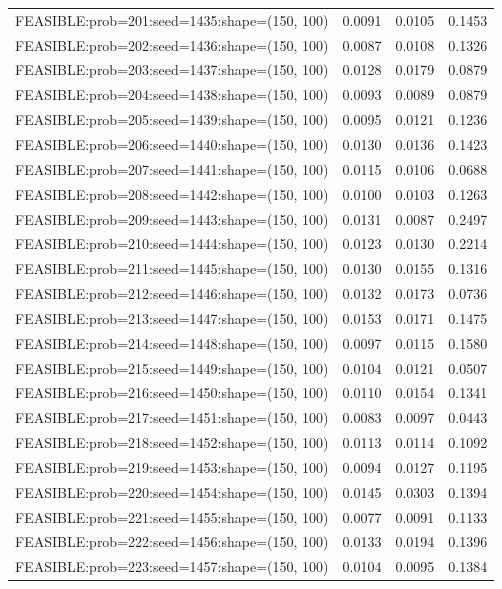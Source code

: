 \begin{longtable}{lccc}
FEASIBLE:prob=201:seed=1435:shape=(150, 100) & 0.0091 & 0.0105 & 0.1453 \\
FEASIBLE:prob=202:seed=1436:shape=(150, 100) & 0.0087 & 0.0108 & 0.1326 \\
FEASIBLE:prob=203:seed=1437:shape=(150, 100) & 0.0128 & 0.0179 & 0.0879 \\
FEASIBLE:prob=204:seed=1438:shape=(150, 100) & 0.0093 & 0.0089 & 0.0879 \\
FEASIBLE:prob=205:seed=1439:shape=(150, 100) & 0.0095 & 0.0121 & 0.1236 \\
FEASIBLE:prob=206:seed=1440:shape=(150, 100) & 0.0130 & 0.0136 & 0.1423 \\
FEASIBLE:prob=207:seed=1441:shape=(150, 100) & 0.0115 & 0.0106 & 0.0688 \\
FEASIBLE:prob=208:seed=1442:shape=(150, 100) & 0.0100 & 0.0103 & 0.1263 \\
FEASIBLE:prob=209:seed=1443:shape=(150, 100) & 0.0131 & 0.0087 & 0.2497 \\
FEASIBLE:prob=210:seed=1444:shape=(150, 100) & 0.0123 & 0.0130 & 0.2214 \\
FEASIBLE:prob=211:seed=1445:shape=(150, 100) & 0.0130 & 0.0155 & 0.1316 \\
FEASIBLE:prob=212:seed=1446:shape=(150, 100) & 0.0132 & 0.0173 & 0.0736 \\
FEASIBLE:prob=213:seed=1447:shape=(150, 100) & 0.0153 & 0.0171 & 0.1475 \\
FEASIBLE:prob=214:seed=1448:shape=(150, 100) & 0.0097 & 0.0115 & 0.1580 \\
FEASIBLE:prob=215:seed=1449:shape=(150, 100) & 0.0104 & 0.0121 & 0.0507 \\
FEASIBLE:prob=216:seed=1450:shape=(150, 100) & 0.0110 & 0.0154 & 0.1341 \\
FEASIBLE:prob=217:seed=1451:shape=(150, 100) & 0.0083 & 0.0097 & 0.0443 \\
FEASIBLE:prob=218:seed=1452:shape=(150, 100) & 0.0113 & 0.0114 & 0.1092 \\
FEASIBLE:prob=219:seed=1453:shape=(150, 100) & 0.0094 & 0.0127 & 0.1195 \\
FEASIBLE:prob=220:seed=1454:shape=(150, 100) & 0.0145 & 0.0303 & 0.1394 \\
FEASIBLE:prob=221:seed=1455:shape=(150, 100) & 0.0077 & 0.0091 & 0.1133 \\
FEASIBLE:prob=222:seed=1456:shape=(150, 100) & 0.0133 & 0.0194 & 0.1396 \\
FEASIBLE:prob=223:seed=1457:shape=(150, 100) & 0.0104 & 0.0095 & 0.1384 \\

\end{longtable}
